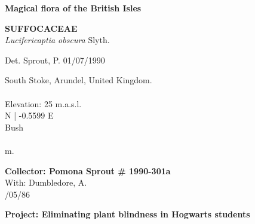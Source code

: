 \documentclass[
]{article}
\begin{document}
\pagebreak
\begin{mdframed}[linewidth=2pt,linecolor=black, innerleftmargin = 1.5 cm, innerrightmargin = 1.5 cm]

\begin{center}
\bigskip
{\fontsize{30pt}{100pt}\selectfont\bf Magical flora of the British Isles } \\
\end{center}
\begin{flushright}
\begin{minipage}[c][20ex][c]{15em}  
\end{minipage}
\end{flushright}
\begin{flushleft}
{\fontsize{35pt}{100pt}\selectfont\bf SUFFOCACEAE  } \\
\vfill
{\fontsize{35pt}{100pt}\selectfont\emph{ Lucifericaptia obscura }  Slyth. } \\
\end{flushleft}
\begin{flushright}
{\fontsize{22.55pt}{100pt}\selectfont Det. Sprout, P.   01/07/1990 } \\
\end{flushright}
\vfill
\bigskip
\bigskip
\begin{flushleft}
{\fontsize{25pt}{100pt}\selectfont South Stoke, Arundel, United Kingdom. } \\
{\fontsize{25pt}{100pt}\selectfont ~ } \\
{\fontsize{25pt}{100pt}\selectfont Elevation: 25 m.a.s.l. }\\
{\fontsize{25pt}{100pt} N  |  -0.5599 E } \\
\vfill
{\fontsize{25pt}{100pt}\selectfont Bush } \\
{\fontsize{25pt}{100pt}\selectfont ~ } \\
{\fontsize{25pt}{100pt} m. } \\
\end{flushleft}
\vfill
\begin{flushright}
{\fontsize{20pt}{100pt}\selectfont\bf Collector:  Pomona Sprout  \# 1990-301a } \\
{\fontsize{20pt}{100pt}\selectfont With:  Dumbledore, A. } \\
{\fontsize{20pt}{100pt}/05/86 } \\
\end{flushright}
\vfill
\begin{center}
{\fontsize{25pt}{80pt}\selectfont\bf  Project: Eliminating plant blindness in Hogwarts students } \\
\end{center}
\end{mdframed}
\end{document}
